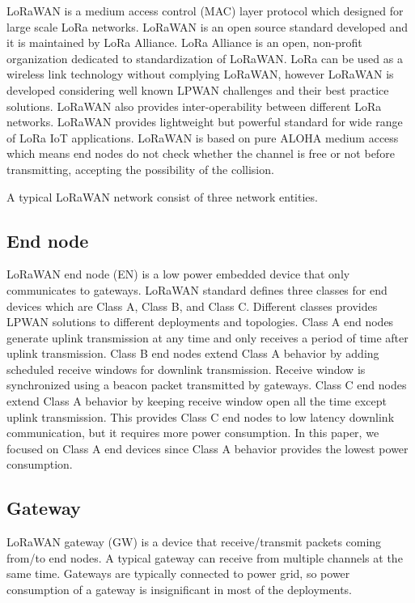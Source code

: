 \documentclass[conference]{IEEEtran}
\begin{document}
\par LoRaWAN is a medium access control (MAC) layer protocol which designed for large scale LoRa networks. LoRaWAN is an open source standard developed and it is maintained by LoRa Alliance. LoRa Alliance is an open, non-profit organization dedicated to standardization of LoRaWAN. LoRa can be used as a wireless link technology without complying LoRaWAN, however LoRaWAN is developed considering well known LPWAN challenges and their best practice solutions. LoRaWAN also provides inter-operability between different LoRa networks. LoRaWAN provides lightweight but powerful standard for wide range of LoRa IoT applications.  LoRaWAN is based on pure ALOHA medium access which means end nodes do not check whether the channel is free or not before transmitting, accepting the possibility of the collision.

\par A typical LoRaWAN network consist of three network entities.

\subsection{End node}
\par LoRaWAN end node (EN) is a low power embedded device that only communicates to gateways. LoRaWAN standard defines three classes for end devices which are Class A, Class B, and Class C. Different classes provides LPWAN solutions to different deployments and topologies. Class A end nodes generate uplink transmission at any time and only receives a period of time after uplink transmission. Class B end nodes extend Class A behavior by adding scheduled receive windows for downlink transmission. Receive window is synchronized using a beacon packet transmitted by gateways. Class C end nodes extend Class A behavior by keeping receive window open all the time except uplink transmission. This provides Class C end nodes to low latency downlink communication, but it requires more power consumption. In this paper, we focused on Class A end devices since Class A behavior provides the lowest power consumption.

\subsection{Gateway}
\par LoRaWAN gateway (GW) is a device that receive/transmit packets coming from/to end nodes. A typical gateway can receive from multiple channels at the same time. Gateways are typically connected to power grid, so power consumption of a gateway is insignificant in most of the deployments.
\end{document}
